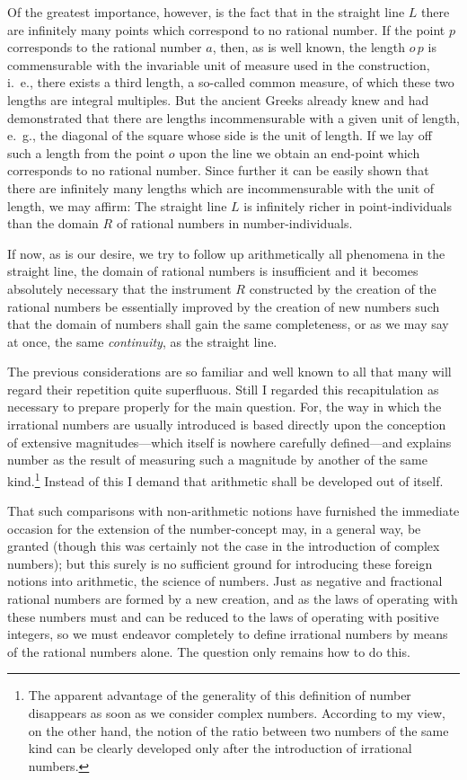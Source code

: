 \documentclass[oneside]{book}
\begin{document}
Of the greatest importance, however, is the fact
that in the straight line $L$ there are infinitely many
points which correspond to no rational number. If
the point $p$ corresponds to the rational number $a$,
then, as is well known, the length $o\,p$ is commensurable
with the invariable unit of measure used in the
construction, i.~e., there exists a third length, a so-called
common measure, of which these two lengths
are integral multiples. But the ancient Greeks already
knew and had demonstrated that there are lengths incommensurable
with a given unit of length, e.~g., the
diagonal of the square whose side is the unit of length.
If we lay off such a length from the point $o$ upon the
line we obtain an end-point which corresponds to no
rational number. Since further it can be easily shown
that there are infinitely many lengths which are incommensurable
with the unit of length, we may affirm:
The straight line $L$ is infinitely richer in point-individuals
than the domain $R$ of rational numbers in
number-individuals.

If now, as is our desire, we try to follow up arithmetically
all phenomena in the straight line, the domain
of rational numbers is insufficient and it becomes
absolutely necessary that the instrument $R$ constructed
by the creation of the rational numbers be essentially
improved by the creation of new numbers such that
the domain of numbers shall gain the same completeness,
or as we may say at once, the same \textit{continuity},
as the straight line.

The previous considerations are so familiar and
well known to all that many will regard their repetition
quite superfluous. Still I regarded this recapitulation
as necessary to prepare properly for the main
question. For, the way in which the irrational numbers
are usually introduced is based directly upon the
conception of extensive magnitudes---which itself is
nowhere carefully defined---and explains number as
the result of measuring such a magnitude by another
of the same kind.\footnote{The apparent advantage of the generality of this definition of number
disappears as soon as we consider complex numbers. According to my view,
on the other hand, the notion of the ratio between two numbers of the same
kind can be clearly developed only after the introduction of irrational numbers.} Instead of this I demand that
arithmetic shall be developed out of itself.

That such comparisons with non-arithmetic notions
have furnished the immediate occasion for the extension
of the number-concept may, in a general way,
be granted (though this was certainly not the case in
the introduction of complex numbers); but this surely
is no sufficient ground for introducing these foreign
notions into arithmetic, the science of numbers. Just
as negative and fractional rational numbers are formed
by a new creation, and as the laws of operating with
these numbers must and can be reduced to the laws
of operating with positive integers, so we must endeavor
completely to define irrational numbers by
means of the rational numbers alone. The question
only remains how to do this.
\end{document}
